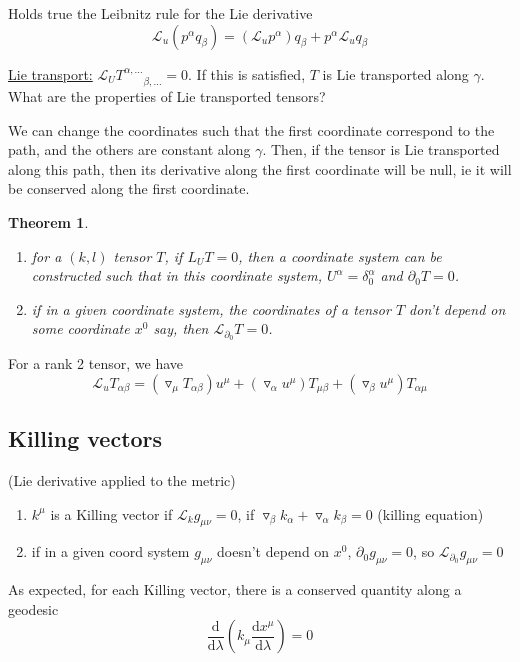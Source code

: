 \documentclass[a4paper]{book}
\newtheorem{theorem}{Theorem}[section]
\theoremstyle{definition}
\theoremstyle{remark}
\begin{document}
Holds true the Leibnitz rule for the Lie derivative
\begin{equation}
    \mathcal{L}_u(p^\alpha q_\beta) = (\mathcal{L}_u p^\alpha)q_\beta + p^\alpha \mathcal{L}_u  q_\beta
\end{equation}

\underline{Lie transport:} $\mathcal{L}_U T^{\alpha, \dots}_{\qquad \beta, \dots} = 0$. If this is satisfied, $T$ is Lie transported along $\gamma$. What are the properties of Lie transported tensors? \par \medskip 

We can change the coordinates such that the first coordinate correspond to the path, and the others are constant along $\gamma$. Then, if the tensor is Lie transported along this path, then its derivative along the first coordinate will be null, ie it will be conserved along the first coordinate. 

\begin{theorem}
    \begin{enumerate}
        \item for a $(k, l)$ tensor $T$, if $L_U T = 0$, then a coordinate system can be constructed such that in this coordinate system, $U^\alpha = \delta^\alpha_0$ and $\partial_0 T= 0$.
        \item if in a given coordinate system, the coordinates of a tensor $T$ don't depend on some coordinate $x^0$ say, then $\mathcal{L}_{\partial_0} T= 0$.  
    \end{enumerate}
\end{theorem}
For a rank 2 tensor, we have
\begin{equation}
    \mathcal{L}_u T_{\alpha\beta} = (\triangledown_\mu T_{\alpha\beta})u^\mu + (\triangledown_\alpha u^\mu)T_{\mu\beta} + (\triangledown_\beta u^\mu)T_{\alpha\mu} 
\end{equation}

\subsection{Killing vectors} (Lie derivative applied to the metric)
\begin{enumerate}
    \item $k^\mu$ is a Killing vector if $\mathcal{L}_k g_{\mu\nu} = 0$, if $\triangledown _\beta k_\alpha + \triangledown _\alpha k_\beta = 0$ (killing equation)
    \item if in a given coord system $g_{\mu\nu}$ doesn't depend on $x^0$, $\partial_0 g_{\mu\nu} = 0$, so $\mathcal{L}_{\partial_0}g_{\mu\nu} = 0$
\end{enumerate}
As expected, for each Killing vector, there is a conserved quantity along a geodesic 
\begin{equation}
    \frac{\text{d}}{\text{d}\lambda}\left(k_\mu \frac{\text{d}x^\mu}{\text{d}\lambda}\right) = 0
\end{equation}
\end{document}
